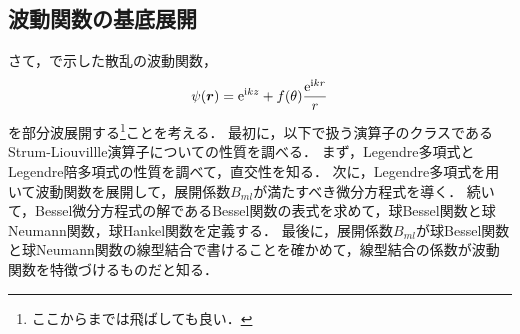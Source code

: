 \documentclass{report}
\begin{document}
  \subsection{波動関数の基底展開}
    さて，で示した散乱の波動関数，
    \begin{align}
      \psi(\bm{r}) = \mathrm{e}^{\mathrm{i} kz} + f(\theta)\frac{\mathrm{e}^{\mathrm{i} kr}}{r}
    \end{align}
    を部分波展開する\footnote{ここからまでは飛ばしても良い．}ことを考える．
    最初に，以下で扱う演算子のクラスであるStrum-Liouvillle演算子についての性質を調べる．
    まず，Legendre多項式とLegendre陪多項式の性質を調べて，直交性を知る．
    次に，Legendre多項式を用いて波動関数を展開して，展開係数$B_{ml}$が満たすべき微分方程式を導く．
    続いて，Bessel微分方程式の解であるBessel関数の表式を求めて，球Bessel関数と球Neumann関数，球Hankel関数を定義する．
    最後に，展開係数$B_{ml}$が球Bessel関数と球Neumann関数の線型結合で書けることを確かめて，線型結合の係数が波動関数を特徴づけるものだと知る．
\end{document}
